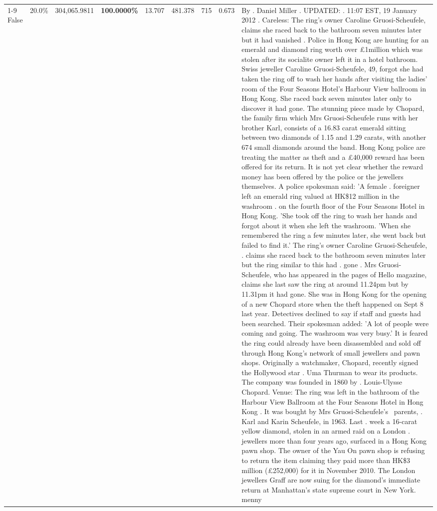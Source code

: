 \begin{table}[H]
\begin{tabular}{lllrlllll}
\cline{1-9}
False & 20.0\% & \color{red} 304,065.9811 & \bfseries \color{red} 100.0000\% & 13.707 & 481.378 & 715 & 0.673 & By . Daniel Miller . UPDATED: . 11:07 EST, 19 January 2012 . Careless: The ring's owner Caroline Gruosi-Scheufele, claims she raced back to the bathroom seven minutes later but it had vanished . Police in Hong Kong are hunting for an emerald and diamond ring worth over £1million which was stolen after its socialite owner left it in a hotel bathroom. Swiss jeweller Caroline Gruosi-Scheufele, 49, forgot she had taken the ring off to wash her hands after visiting the ladies' room of the Four Seasons Hotel's Harbour View ballroom in Hong Kong. She raced back seven minutes later only to discover it had gone. The stunning piece made by Chopard, the family firm which Mrs Gruosi-Scheufele runs with her brother Karl, consists of a 16.83 carat emerald sitting between two diamonds of 1.15 and 1.29 carats, with another 674 small diamonds around the band. Hong Kong police are treating the matter as theft and a £40,000 reward has been offered for its return. It is not yet clear whether the reward money has been offered by the police or the jewellers themselves. A police spokesman said: 'A female . foreigner left an emerald ring valued at HK\$12 million in the washroom . on the fourth floor of the Four Seasons Hotel in Hong Kong. 'She took off the ring to wash her hands and forgot about it when she left the washroom. 'When she remembered the ring a few minutes later, she went back but failed to find it.' The ring's owner Caroline Gruosi-Scheufele, . claims she raced back to the bathroom seven minutes later but the ring similar to this had . gone . Mrs Gruosi-Scheufele, who has appeared in the pages of Hello magazine, claims she last saw the ring at around 11.24pm but by 11.31pm it had gone. She was in Hong Kong for the opening of a new Chopard store when the theft happened on Sept 8 last year. Detectives declined to say if staff and guests had been searched. Their spokesman added: 'A lot of people were coming and going. The washroom was very busy.' It is feared the ring could already have been disassembled and sold off through Hong Kong's network of small jewellers and pawn shops. Originally a watchmaker, Chopard, recently signed the Hollywood star . Uma Thurman to wear its products. The company was founded in 1860 by . Louis-Ulysse Chopard. Venue: The ring was left in the bathroom of the Harbour View Ballroom at the Four Seasons Hotel in Hong Kong . It was bought by Mrs Gruosi-Scheufele's  parents, . Karl and Karin Scheufele, in 1963. Last . week a 16-carat yellow diamond, stolen in an armed raid on a London . jewellers more than four years ago, surfaced in a Hong Kong pawn shop. The owner of the Yau On pawn shop is refusing to return the item claiming they paid more than HK\$3 million (£252,000) for it in November 2010. The London jewellers Graff are now suing for the diamond’s immediate return at Manhattan’s state supreme court in New York. menny \\

\end{tabular}
\end{table}
